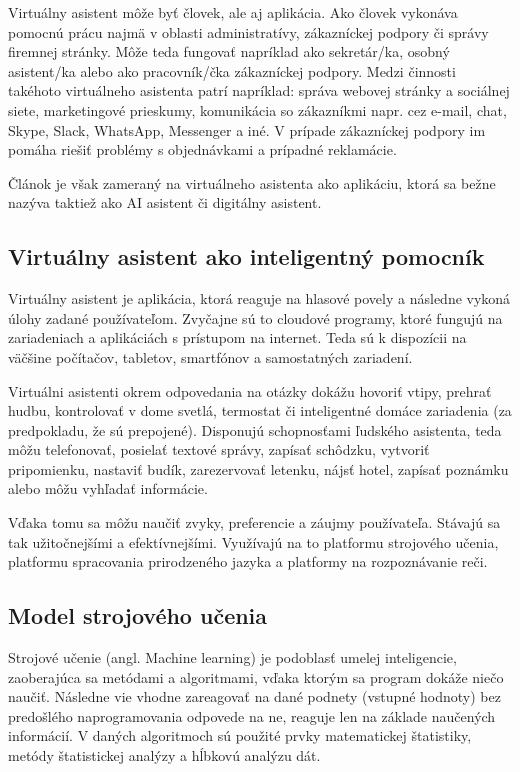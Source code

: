 \documentclass[10pt,twoside,slovak,coursepaper]{article}
\begin{document}
Virtuálny asistent môže byť človek, ale aj aplikácia. Ako človek vykonáva pomocnú prácu najmä v oblasti administratívy, zákazníckej podpory či správy firemnej stránky. Môže teda fungovať napríklad ako sekretár/ka, osobný asistent/ka alebo ako pracovník/čka zákazníckej podpory. Medzi činnosti takéhoto virtuálneho asistenta patrí napríklad: správa webovej stránky a sociálnej siete, marketingové prieskumy, komunikácia so zákazníkmi napr. cez e-mail, chat, Skype, Slack, WhatsApp, Messenger a iné. V prípade zákazníckej podpory im pomáha riešiť problémy s objednávkami a prípadné reklamácie.\cite{Bouhanikova}

Článok je však zameraný na virtuálneho asistenta ako aplikáciu, ktorá sa bežne nazýva taktiež ako AI asistent či digitálny asistent. 

\subsection{Virtuálny asistent ako inteligentný pomocník}

Virtuálny asistent je aplikácia, ktorá reaguje na hlasové povely a následne vykoná úlohy zadané používateľom. Zvyčajne sú to cloudové programy, ktoré fungujú na zariadeniach a aplikáciách s prístupom na internet. Teda sú k dispozícii na väčšine počítačov, tabletov, smartfónov a samostatných zariadení.\cite{Gupta}

Virtuálni asistenti okrem odpovedania na otázky dokážu hovoriť vtipy, prehrať hudbu, kontrolovať v dome svetlá, termostat či inteligentné domáce zariadenia (za predpokladu, že sú prepojené). Disponujú schopnosťami ľudského asistenta, teda môžu telefonovať, posielať textové správy, zapísať schôdzku, vytvoriť pripomienku, nastaviť budík, zarezervovať letenku, nájsť hotel, zapísať poznámku alebo môžu vyhľadať informácie. \cite{McLaughlin}

Vďaka tomu sa môžu naučiť zvyky, preferencie a záujmy používateľa. Stávajú sa tak užitočnejšími a efektívnejšími. Využívajú na to platformu strojového učenia, platformu spracovania prirodzeného jazyka a platformy na rozpoznávanie reči.\cite{Botelho}

\subsection{Model strojového učenia}

Strojové učenie (angl. Machine learning) je podoblasť umelej inteligencie, zaoberajúca sa metódami a algoritmami, vďaka ktorým sa program dokáže niečo naučiť. Následne vie vhodne zareagovať na dané podnety (vstupné hodnoty) bez predošlého naprogramovania odpovede na ne, reaguje len na základe naučených informácií. V daných algoritmoch sú použité prvky matematickej štatistiky, metódy štatistickej analýzy a hĺbkovú analýzu dát. \cite{Cibula}
\end{document}
